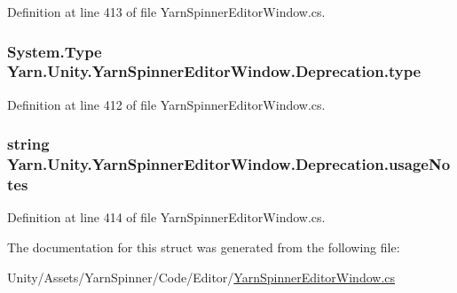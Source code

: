 Definition at line 413 of file Yarn\-Spinner\-Editor\-Window.\-cs.

\hypertarget{a00086_a750904df254223bf3131c39017f90a0b}{
\subsubsection[{type}]{\setlength{\rightskip}{0pt plus 5cm}System.\-Type Yarn.\-Unity.\-Yarn\-Spinner\-Editor\-Window.\-Deprecation.\-type}}\label{a00086_a750904df254223bf3131c39017f90a0b}


Definition at line 412 of file Yarn\-Spinner\-Editor\-Window.\-cs.

\hypertarget{a00086_ac23509be7ae6b43a3e2154dd430954a7}{
\subsubsection[{usage\-Notes}]{\setlength{\rightskip}{0pt plus 5cm}string Yarn.\-Unity.\-Yarn\-Spinner\-Editor\-Window.\-Deprecation.\-usage\-Notes}}\label{a00086_ac23509be7ae6b43a3e2154dd430954a7}


Definition at line 414 of file Yarn\-Spinner\-Editor\-Window.\-cs.



The documentation for this struct was generated from the following file\-:\begin{DoxyCompactItemize}
\item 
Unity/\-Assets/\-Yarn\-Spinner/\-Code/\-Editor/\hyperlink{a00270}{Yarn\-Spinner\-Editor\-Window.\-cs}\end{DoxyCompactItemize}
